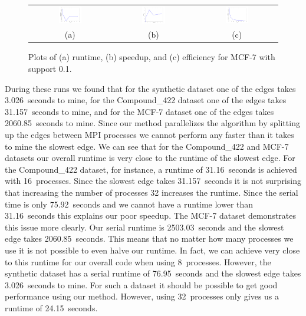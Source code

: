 \begin{figure}[H]
\centering
\begin{tabular}{ccc}
\includegraphics[width=0.3\textwidth]{mcg7_time.png} &
\includegraphics[width=0.3\textwidth]{mcg7_speedup.png} &
\includegraphics[width=0.3\textwidth]{mcg7_efficiency.png} \\
(a) & (b) & (c) \\
\end{tabular}
\caption{Plots of (a) runtime, (b) speedup, and (c) efficiency for
         MCF-7 with support 0.1.}
\label{fig:mcg7}
\end{figure}


During these runs we found that
for the synthetic dataset one of the edges takes 3.026~seconds to mine,
for the Compound\_422 dataset one of the edges takes 31.157~seconds to mine,
and for the MCF-7 dataset one of the edges takes 2060.85~seconds to mine.
Since our method parallelizes the algorithm by splitting up the edges between
MPI processes we cannot perform any faster than it takes to
mine the slowest edge.
We can see that for the Compound\_422 and MCF-7 datasets our overall runtime
is very close to the runtime of the slowest edge. For the Compound\_422
dataset, for instance, a runtime of 31.16~seconds is achieved with
16~processes. Since the slowest edge takes 31.157~seconds it is not surprising
that increasing the number of processes 32 increases the runtime. Since the
serial time is only 75.92~seconds and we cannot have a runtime lower than
31.16~seconds this explains our poor speedup.
The MCF-7 dataset demonstrates this issue more clearly. Our serial runtime
is 2503.03~seconds and the slowest edge takes 2060.85~seconds. This means
that no matter how many processes we use it is not possible to even halve
our runtime. In fact, we can achieve very close to this runtime for our
overall code when using 8~processes.
However, the synthetic dataset has a serial runtime of 76.95~seconds and
the slowest edge takes 3.026~seconds to mine. For such a dataset it should
be possible to get good performance using our method. However, using
32~processes only gives us a runtime of 24.15~seconds.

